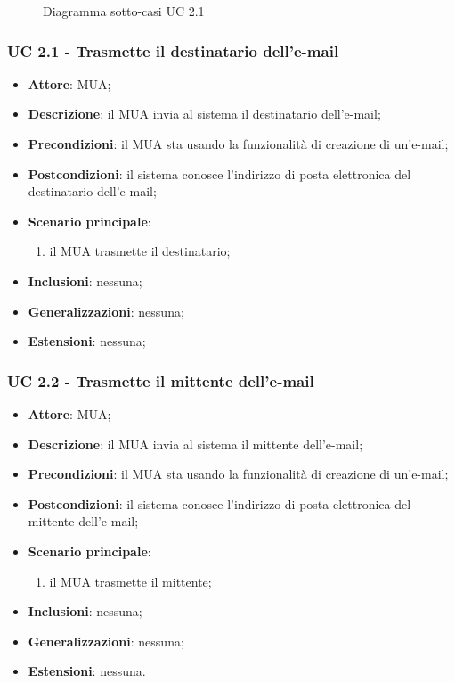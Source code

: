     \begin{figure}[h]
        \centering
        \caption{Diagramma sotto-casi UC 2.1}
    \end{figure}

    \subsubsection{UC 2.1 - Trasmette il destinatario dell'e-mail} \label{sec:UC2.1}
    \begin{itemize}
        \item \textbf{Attore}: MUA;
        \item \textbf{Descrizione}: il MUA invia al sistema il destinatario dell'e-mail;
        \item \textbf{Precondizioni}: il MUA sta usando la funzionalità di creazione di un'e-mail;
        \item \textbf{Postcondizioni}: il sistema conosce l'indirizzo di posta elettronica del destinatario dell'e-mail;
        \item \textbf{Scenario principale}:
            \begin{enumerate}
                \item il MUA trasmette il destinatario;
            \end{enumerate}
        \item \textbf{Inclusioni}: nessuna;
        \item \textbf{Generalizzazioni}: nessuna;
        \item \textbf{Estensioni}: nessuna;
    \end{itemize}

    \subsubsection{UC 2.2 - Trasmette il mittente dell'e-mail} \label{sec:UC2.2}
    \begin{itemize}
        \item \textbf{Attore}: MUA;
        \item \textbf{Descrizione}: il MUA invia al sistema il mittente dell'e-mail;
        \item \textbf{Precondizioni}: il MUA sta usando la funzionalità di creazione di un'e-mail;
        \item \textbf{Postcondizioni}: il sistema conosce l'indirizzo di posta elettronica del mittente dell'e-mail;
        \item \textbf{Scenario principale}:
            \begin{enumerate}
                \item il MUA trasmette il mittente;
            \end{enumerate}
        \item \textbf{Inclusioni}: nessuna;
        \item \textbf{Generalizzazioni}: nessuna;
        \item \textbf{Estensioni}: nessuna.
    \end{itemize}

